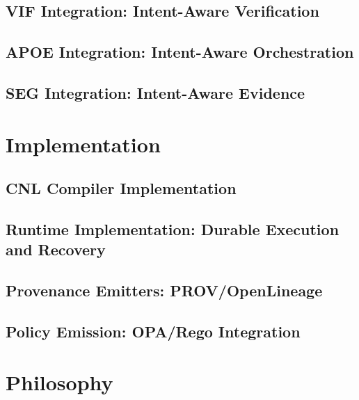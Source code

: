 \documentclass[11pt,a4paper,twoside]{book}
\theoremstyle{definition}
\theoremstyle{remark}
\begin{document}
\chapter{VIF Integration: Intent-Aware Verification}
\label{ch:10}


\chapter{APOE Integration: Intent-Aware Orchestration}
\label{ch:11}


\chapter{SEG Integration: Intent-Aware Evidence}
\label{ch:12}


\part{Implementation}
\label{part:implementation}

\chapter{CNL Compiler Implementation}
\label{ch:13}


\chapter{Runtime Implementation: Durable Execution and Recovery}
\label{ch:14}


\chapter{Provenance Emitters: PROV/OpenLineage}
\label{ch:15}


\chapter{Policy Emission: OPA/Rego Integration}
\label{ch:16}


\part{Philosophy}
\label{part:philosophy}
\end{document}
